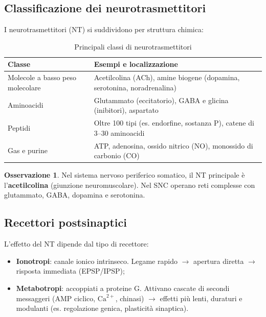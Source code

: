 \documentclass[11pt,a4paper,italian,twoside]{report}
\theoremstyle{definition} %
\newtheorem{remark}{Osservazione}[section]
\begin{document}
\subsection{Classificazione dei neurotrasmettitori}
\label{subsec:nt_classificazione}

I neurotrasmettitori (NT) si suddividono per struttura chimica:

\begin{table}[htbp]
  \centering
  \caption{Principali classi di neurotrasmettitori}
  \label{tab:nt_classi}
  \begin{tabularx}{\textwidth}{l X}
    \toprule
    \textbf{Classe} & \textbf{Esempi e localizzazione} \\
    \midrule
    Molecole a basso peso molecolare & Acetilcolina (ACh), amine biogene (dopamina, serotonina, noradrenalina) \\
    \addlinespace
    Aminoacidi & Glutammato (eccitatorio), GABA e glicina (inibitori), aspartato \\
    \addlinespace
    Peptidi & Oltre 100 tipi (es. endorfine, sostanza P), catene di 3–30 aminoacidi \\
    \addlinespace
    Gas e purine & ATP, adenosina, ossido nitrico (NO), monossido di carbonio (CO) \\
    \bottomrule
  \end{tabularx}
\end{table}

\begin{remark}
Nel sistema nervoso periferico somatico, il NT principale è l'\textbf{acetilcolina} (giunzione neuromuscolare). Nel SNC operano reti complesse con glutammato, GABA, dopamina e serotonina.
\end{remark}

\subsection{Recettori postsinaptici}
\label{subsec:recettori}

L'effetto del NT dipende dal tipo di recettore:
\begin{itemize}
  \item \textbf{Ionotropi}: canale ionico intrinseco. Legame rapido $\rightarrow$ apertura diretta $\rightarrow$ risposta immediata (EPSP/IPSP);
  \item \textbf{Metabotropi}: accoppiati a proteine G. Attivano cascate di secondi messaggeri (AMP ciclico, $\mathrm{Ca}^{2+}$, chinasi) $\rightarrow$ effetti più lenti, duraturi e modulanti (es. regolazione genica, plasticità sinaptica).
\end{itemize}
\end{document}
